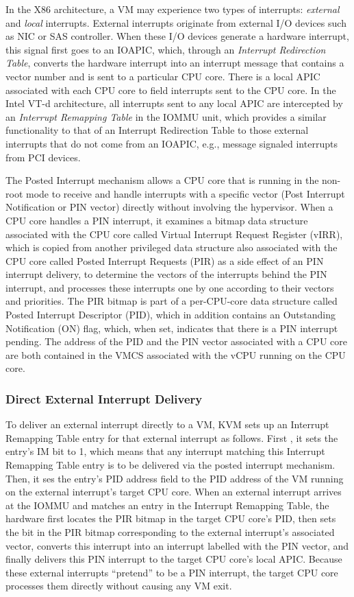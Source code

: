 In the X86 architecture, a VM may experience two types of interrupts: {\em external} and {\em local} interrupts.
External interrupts originate from external I/O devices such as NIC or SAS controller.
When these I/O devices generate a hardware interrupt, this signal first goes to an IOAPIC, which, through an {\em Interrupt Redirection Table}, 
converts the hardware interrupt into an interrupt message that contains a vector number and is sent to a particular CPU core.
There is a local APIC associated with each CPU core to field interrupts sent to the CPU core.
In the Intel VT-d architecture, all interrupts sent to any local APIC are intercepted by  an {\em Interrupt Remapping Table} in the IOMMU unit, 
which provides a similar functionality to that of an Interrupt Redirection Table
to those external interrupts that do not come from an IOAPIC, e.g., message signaled interrupts from PCI devices.

The Posted Interrupt mechanism allows a CPU core that is running in the non-root mode to receive and handle interrupts with a specific vector
(Post Interrupt Notification or PIN vector) directly without involving the hypervisor.
When a CPU core handles a PIN interrupt, it examines a bitmap data structure associated with the CPU core called Virtual Interrupt Request Register (vIRR),
which is copied from another privileged data structure also associated with the CPU core called Posted Interrupt Requests (PIR) as a side effect of an PIN interrupt delivery,  
to determine the vectors of the interrupts behind the PIN interrupt, and processes these interrupts one by one according to their vectors and priorities.
The PIR bitmap is part of a per-CPU-core data structure called Posted Interrupt Descriptor (PID), which in addition contains an Outstanding Notification (ON) flag, which, when set, indicates that there is a PIN interrupt pending.  
The address of the PID and the PIN vector associated with a CPU core are both contained in the VMCS associated with the vCPU running on the CPU core.

\subsubsection{Direct External Interrupt Delivery}

To deliver an external interrupt directly to a VM, KVM sets up an Interrupt Remapping Table entry for that external interrupt as follows.
First , it sets the entry's IM bit to 1, which means that any interrupt matching this Interrupt Remapping Table entry is to be delivered via the posted interrupt 
mechanism.  
Then, it ses the entry's PID address field to the PID address of the VM running on the external interrupt's target CPU core. 
When an external interrupt arrives at the IOMMU and matches an entry in the Interrupt Remapping Table, the 
hardware first locates the PIR bitmap in the target CPU core's PID, then sets the bit in the PIR bitmap corresponding to the external interrupt's associated vector,
converts this interrupt into an interrupt labelled with the PIN vector, and finally delivers this PIN interrupt to the target CPU core's local APIC.
Because these external interrupts ``pretend'' to be a PIN interrupt, the target CPU core processes them directly without causing any VM exit.

